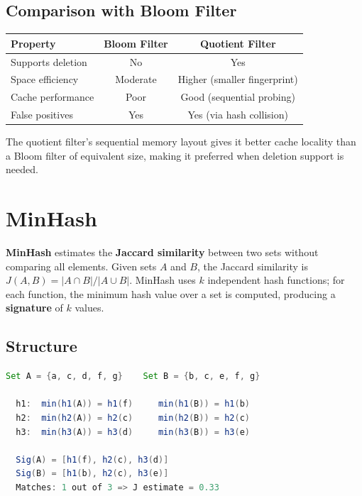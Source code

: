 \subsection{Comparison with Bloom Filter}

\begin{center}
\begin{tabular}{lcc}
\toprule
Property & Bloom Filter & Quotient Filter \\
\midrule
Supports deletion & No & Yes \\
Space efficiency & Moderate & Higher (smaller fingerprint) \\
Cache performance & Poor & Good (sequential probing) \\
False positives & Yes & Yes (via hash collision) \\
\bottomrule
\end{tabular}
\end{center}

\noindent The quotient filter's sequential memory layout gives it better cache locality than a Bloom filter of equivalent size, making it preferred when deletion support is needed.

\section{MinHash}

\textbf{MinHash} estimates the \textbf{Jaccard similarity} between two sets without comparing all elements. Given sets $A$ and $B$, the Jaccard similarity is $J(A,B) = |A \cap B| / |A \cup B|$. MinHash uses $k$ independent hash functions; for each function, the minimum hash value over a set is computed, producing a \textbf{signature} of $k$ values.

\subsection{Structure}

\begin{lstlisting}[language=Java]
Set A = {a, c, d, f, g}    Set B = {b, c, e, f, g}

  h1:  min(h1(A)) = h1(f)     min(h1(B)) = h1(b)
  h2:  min(h2(A)) = h2(c)     min(h2(B)) = h2(c)
  h3:  min(h3(A)) = h3(d)     min(h3(B)) = h3(e)

  Sig(A) = [h1(f), h2(c), h3(d)]
  Sig(B) = [h1(b), h2(c), h3(e)]
  Matches: 1 out of 3 => J estimate = 0.33
\end{lstlisting}

